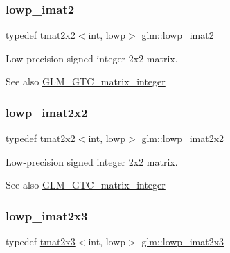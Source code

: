 \subsubsection{\texorpdfstring{lowp\+\_\+imat2}{lowp\_imat2}}
{\footnotesize\ttfamily typedef \hyperlink{structglm_1_1tmat2x2}{tmat2x2}$<$int, lowp$>$ \hyperlink{group__gtc__matrix__integer_ga4840a4d8b9e8997f1173da9e8e5e4de4}{glm\+::lowp\+\_\+imat2}}

Low-\/precision signed integer 2x2 matrix. \begin{DoxySeeAlso}{See also}
\hyperlink{group__gtc__matrix__integer}{G\+L\+M\+\_\+\+G\+T\+C\+\_\+matrix\+\_\+integer} 
\end{DoxySeeAlso}
\mbox{\label{group__gtc__matrix__integer_gad1950bd75bc033e8511cec3deb15af56}} 
\subsubsection{\texorpdfstring{lowp\+\_\+imat2x2}{lowp\_imat2x2}}
{\footnotesize\ttfamily typedef \hyperlink{structglm_1_1tmat2x2}{tmat2x2}$<$int, lowp$>$ \hyperlink{group__gtc__matrix__integer_gad1950bd75bc033e8511cec3deb15af56}{glm\+::lowp\+\_\+imat2x2}}

Low-\/precision signed integer 2x2 matrix. \begin{DoxySeeAlso}{See also}
\hyperlink{group__gtc__matrix__integer}{G\+L\+M\+\_\+\+G\+T\+C\+\_\+matrix\+\_\+integer} 
\end{DoxySeeAlso}
\mbox{\label{group__gtc__matrix__integer_ga00e00501dd9bf929e1dca7a167ba526b}} 
\subsubsection{\texorpdfstring{lowp\+\_\+imat2x3}{lowp\_imat2x3}}
{\footnotesize\ttfamily typedef \hyperlink{structglm_1_1tmat2x3}{tmat2x3}$<$int, lowp$>$ \hyperlink{group__gtc__matrix__integer_ga00e00501dd9bf929e1dca7a167ba526b}{glm\+::lowp\+\_\+imat2x3}}

